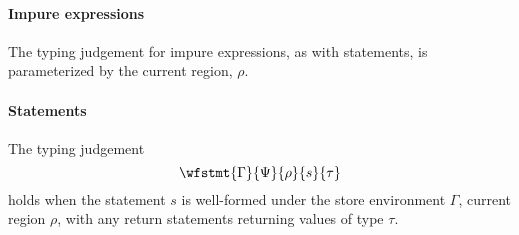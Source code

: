 \paragraph{Impure expressions}
The typing judgement for impure expressions, as with statements, is
parameterized by the current region, $\rho$.  


\paragraph{Statements}
The typing judgement 
\[
\wfstmt{\Gamma}{\Psi}{\rho}{s}{\tau}
\]
holds when the statement $s$ is well-formed under the store
environment $\Gamma$, current region $\rho$, with any return
statements returning values of type $\tau$.

